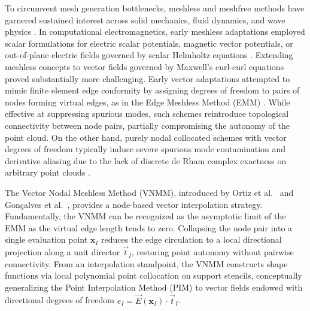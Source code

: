 \documentclass[VANCOUVER,Times1COL]{WileyNJD-v5}
\begin{document}
To circumvent mesh generation bottlenecks, meshless and meshfree methods have garnered sustained interest across solid mechanics, fluid dynamics, and wave physics \cite{belytschko2023meshfree, liu2009mesh, fasshauer2007meshfree, atluri2004meshless}. In computational electromagnetics, early meshless adaptations employed scalar formulations for electric scalar potentials, magnetic vector potentials, or out-of-plane electric fields governed by scalar Helmholtz equations \cite{viana1999moving, ho2001moving, parreira2006element, nicomedes2012meshless}. Extending meshless concepts to vector fields governed by Maxwell's curl-curl equations proved substantially more challenging. Early vector adaptations attempted to mimic finite element edge conformity by assigning degrees of freedom to pairs of nodes forming virtual edges, as in the Edge Meshless Method (EMM) \cite{lima2017edge}. While effective at suppressing spurious modes, such schemes reintroduce topological connectivity between node pairs, partially compromising the autonomy of the point cloud. On the other hand, purely nodal collocated schemes with vector degrees of freedom typically induce severe spurious mode contamination and derivative aliasing due to the lack of discrete de Rham complex exactness on arbitrary point clouds \cite{bossavit1990spurious, boffi2006finite}.

The Vector Nodal Meshless Method (VNMM), introduced by Ortiz et al.~\cite{ortiz2021nodal, ortiz2023tese} and Gonçalves et al.~\cite{goncalves2023vector, goncalves2025tese}, provides a node-based vector interpolation strategy. Fundamentally, the VNMM can be recognized as the asymptotic limit of the EMM as the virtual edge length tends to zero. Collapsing the node pair into a single evaluation point $\mathbf{x}_I$ reduces the edge circulation to a local directional projection along a unit director $\vec{t}_I$, restoring point autonomy without pairwise connectivity. From an interpolation standpoint, the VNMM constructs shape functions via local polynomial point collocation on support stencils, conceptually generalizing the Point Interpolation Method (PIM) \cite{liu2001point, liu2005introduction} to vector fields endowed with directional degrees of freedom $e_I = \vec{E}(\mathbf{x}_I) \cdot \vec{t}_I$.
\end{document}
